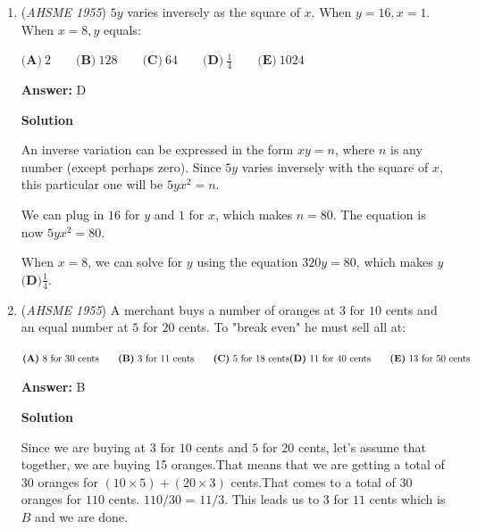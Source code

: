 \begin{enumerate}
\textbf{Solution 2 (answer choices)}

Looking at the answer choices, we can see B, C, and D are incorrect because $x = 1$ and $x = 2$ result in division by $0$.

 Plugging in $0$ gives:

 $\frac{1}{0 - 1} = \frac{1}{-1} = -1$
$\frac{2}{0 - 2} = \frac{2}{-2} = -1$

 These two are equal, so the answer is $\fbox{{\textbf(E)} \text{only} x = 0}$.

 


	\item (\textit{AHSME 1955}) $5y$ varies inversely as the square of $x$. When $y=16, x=1$. When $x=8, y$ equals: 


 $\textbf{(A)}\ 2 \qquad \textbf{(B)}\ 128 \qquad \textbf{(C)}\ 64 \qquad \textbf{(D)}\ \frac{1}{4} \qquad \textbf{(E)}\ 1024$

 \textbf{Answer: }D



\textbf{Solution}

An inverse variation can be expressed in the form $xy = n$, where $n$ is any number (except perhaps zero). Since $5y$ varies inversely with the square of $x$, this particular one will be $5yx^2 = n$. 

 We can plug in $16$ for $y$ and $1$ for $x$, which makes $n=80$. The equation is now $5yx^2 = 80$.

 When $x = 8$, we can solve for $y$ using the equation $320y = 80$, which makes $y$ $\boxed{\textbf{(D)} \frac{1}{4}}$.

 


	\item (\textit{AHSME 1955}) A merchant buys a number of oranges at $3$ for $10$ cents and an equal number at $5$ for $20$ cents. To "break even" he must sell all at: 


 $\textbf{(A)}\ \text{8 for 30 cents}\qquad\textbf{(B)}\ \text{3 for 11 cents}\qquad\textbf{(C)}\ \text{5 for 18 cents}\\ \textbf{(D)}\ \text{11 for 40 cents}\qquad\textbf{(E)}\ \text{13 for 50 cents}$

 \textbf{Answer: }B



\textbf{Solution}

Since we are buying at $3$ for $10$ cents and $5$ for $20$ cents, let's assume that together, we are buying 15 oranges.That means that we are getting a total of $30$ oranges for $(10\times5) + (20\times3)$ cents.That comes to a total of $30$ oranges for $110$ cents. $110/30$ = $11/3$. This leads us to $3$ for $11$ cents which is $\boxed{B}$ and we are done.


\end{enumerate}
